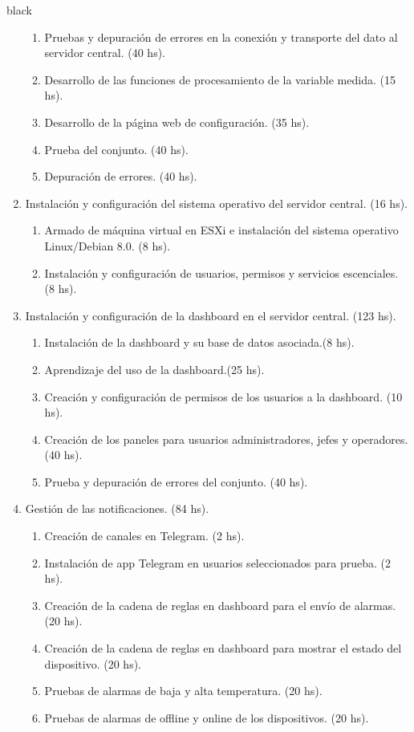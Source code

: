 \documentclass[11pt]{charter}
\begin{document}
\begin{consigna}{black}
\begin{enumerate}
\begin{enumerate}
	\item Pruebas y depuración de errores en la conexión y transporte del dato al servidor central. (40 hs).
	\item Desarrollo de las funciones de procesamiento de la variable medida. (15 hs).
	\item Desarrollo de la página web de configuración. (35 hs).
	\item Prueba del conjunto. (40 hs).
	\item Depuración de errores. (40 hs).
	\end{enumerate}
\item Instalación y configuración del sistema operativo del servidor central. (16 hs).
	\begin{enumerate}
	\item Armado de máquina virtual en ESXi e instalación del sistema operativo Linux/Debian 8.0.  (8 hs).
	\item Instalación y configuración de usuarios, permisos y servicios escenciales.  (8 hs).
	\end{enumerate}	
	
\item Instalación y configuración de la dashboard en el servidor central.  (123 hs).
	\begin{enumerate}
	\item Instalación de la dashboard y su base de datos asociada.(8 hs).
	\item Aprendizaje del uso de la dashboard.(25 hs).
	\item Creación y configuración de permisos de los usuarios a la dashboard. (10 hs).
	\item Creación de los paneles para usuarios administradores, jefes y operadores. (40 hs).
	\item Prueba y depuración de errores del conjunto. (40 hs).
	\end{enumerate}		
	
\item Gestión de las notificaciones. (84 hs).
	\begin{enumerate}
	\item Creación de canales en Telegram. (2 hs).
	\item Instalación de app Telegram en usuarios seleccionados para prueba. (2 hs).
	\item Creación de la cadena de reglas en dashboard para el envío de alarmas. (20 hs).
	\item Creación de la cadena de reglas en dashboard para mostrar el estado del dispositivo. (20 hs).
	\item Pruebas de alarmas de baja y alta temperatura. (20 hs).
	\item Pruebas de alarmas de offline y online de los dispositivos. (20 hs).
	\end{enumerate}		


\end{enumerate}
\end{consigna}
\end{document}
